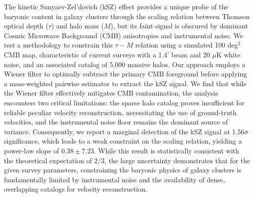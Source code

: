 \documentclass[]{article}
\begin{document}
The kinetic Sunyaev-Zel'dovich (kSZ) effect provides a unique probe of the baryonic content in galaxy clusters through the scaling relation between Thomson optical depth ($\tau$) and halo mass ($M$), but its faint signal is obscured by dominant Cosmic Microwave Background (CMB) anisotropies and instrumental noise. We test a methodology to constrain this $\tau-M$ relation using a simulated 100 deg$^2$ CMB map, characteristic of current surveys with a 1.4' beam and 20 $\mu$K white noise, and an associated catalog of 5,000 massive halos. Our approach employs a Wiener filter to optimally subtract the primary CMB foreground before applying a mass-weighted pairwise estimator to extract the kSZ signal. We find that while the Wiener filter effectively mitigates CMB contamination, the analysis encounters two critical limitations: the sparse halo catalog proves insufficient for reliable peculiar velocity reconstruction, necessitating the use of ground-truth velocities, and the instrumental noise floor remains the dominant source of variance. Consequently, we report a marginal detection of the kSZ signal at 1.56$\sigma$ significance, which leads to a weak constraint on the scaling relation, yielding a power-law slope of $0.38 \pm 7.23$. While this result is statistically consistent with the theoretical expectation of $2/3$, the large uncertainty demonstrates that for the given survey parameters, constraining the baryonic physics of galaxy clusters is fundamentally limited by instrumental noise and the availability of dense, overlapping catalogs for velocity reconstruction.
\end{document}
